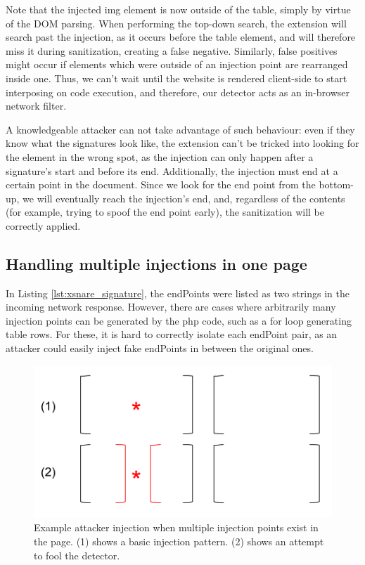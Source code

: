 Note that the injected img element is now outside of the table, simply by virtue of the DOM parsing. When performing the top-down search, the extension will search past the injection, as it occurs before the table element, and will therefore miss it during sanitization, creating a false negative. Similarly, false positives might occur if elements which were outside of an injection point are rearranged inside one. Thus, we can't wait until the website is rendered client-side to start interposing on code execution, and therefore, our detector acts as an in-browser network filter.

A knowledgeable attacker can not take advantage of such behaviour: even if they know what the signatures look like, the extension can't be tricked into looking for the element in the wrong spot, as the injection can only happen after a signature's start and before its end. Additionally, the injection must end at a certain point in the document. Since we look for the end point from the bottom-up, we will eventually reach the injection's end, and, regardless of the contents (for example, trying to spoof the end point early), the sanitization will be correctly applied.

\subsection{Handling multiple injections in one page} \label{multiple_injections}
In Listing \ref{lst:xsnare_signature}, the endPoints were listed as two strings in the incoming network response. However, there are cases where arbitrarily many injection points can be generated by the php code, such as a for loop generating table rows. For these, it is hard to correctly isolate each endPoint pair, as an attacker could easily inject fake endPoints in between the original ones.

\begin{figure}[h]
	\includegraphics[scale=0.5]{img/attacker_injection_compound.png}
	\caption{Example attacker injection when multiple injection points exist in the page. (1) shows a basic injection pattern. (2) shows an attempt to fool the detector.}
	\label{fig:attacker_injection}
\end{figure}

